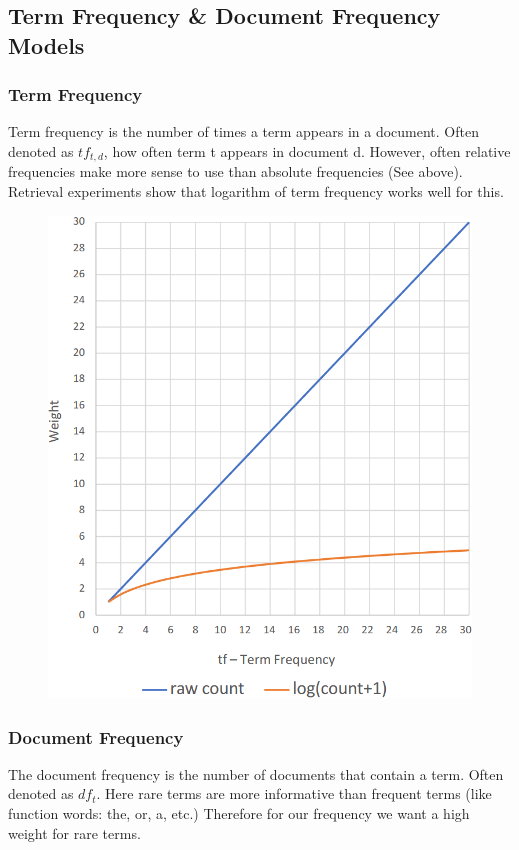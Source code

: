 \documentclass[
../../NLP4W_Summary.tex,
]
{subfiles}
\begin{document}
\subsection{Term Frequency \& Document Frequency Models}
\subsubsection{Term Frequency}
Term frequency is the number of times a term appears in a document. Often denoted as $tf_{t,d}$, how often term t appears in document d. However, often relative frequencies make more sense to use than absolute frequencies (See above). Retrieval experiments show that logarithm of term frequency works well for this.
\begin{figure}
    [htp]
    \centering
    \includegraphics[scale=0.4]{Pics/AbsoluteVSRelativeFrequency.png}
\end{figure}

\subsubsection{Document Frequency}
The document frequency is the number of documents that contain a term. Often denoted as $df_t$.
Here rare terms are more informative than frequent terms (like function words: the, or, a, etc.)
Therefore for our frequency we want a high weight for rare terms.
\end{document}
